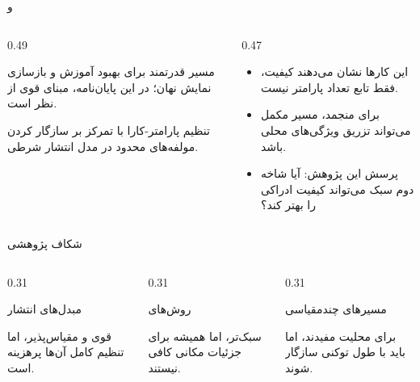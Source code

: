 \documentclass[aspectratio=169, 10pt]{beamer}
\newcommand{\duo}{\lr{DuoDiT}}
\newcommand{\dit}{\lr{DiT}}
\newcommand{\fid}{\lr{FID}}
\newcommand{\compactitems}{\setlength{\itemsep}{0.35em}}
\newcommand{\duoTag}[2]{%
    \begingroup
    {\color{#1}\bfseries\scriptsize #2}%
    \endgroup
}
\newenvironment{duobox}[1]{%
    \begin{block}{#1}\setlength{\parskip}{0.2em}\small
}{%
    \end{block}
}
\begin{document}
\begin{frame}{ و }
    \begin{columns}[onlytextwidth]
        \begin{column}{0.49\textwidth}
            \begin{duobox}{}
                مسیر قدرتمند برای بهبود آموزش و بازسازی نمایش نهان؛ در این پایان‌نامه، مبنای قوی از نظر \fid{} است.
            \end{duobox}
            \begin{duobox}{}
                تنظیم پارامتر-کارا با تمرکز بر سازگار کردن مولفه‌های محدود در مدل انتشار شرطی.
            \end{duobox}
        \end{column}
        \begin{column}{0.47\textwidth}
            \begin{itemize}
                \compactitems
                \item این کارها نشان می‌دهند کیفیت، فقط تابع تعداد پارامتر نیست.
                \item برای \dit{} منجمد، مسیر مکمل می‌تواند تزریق ویژگی‌های محلی باشد.
                \item پرسش این پژوهش: آیا شاخه دوم سبک می‌تواند کیفیت ادراکی را بهتر کند؟
            \end{itemize}
        \end{column}
    \end{columns}
\end{frame}

\begin{frame}{شکاف پژوهشی}
    \begin{columns}[onlytextwidth]
        \begin{column}{0.31\textwidth}
            \begin{duobox}{مبدل‌های انتشار}
                قوی و مقیاس‌پذیر، اما تنظیم کامل آن‌ها پرهزینه است.
            \end{duobox}
        \end{column}
        \begin{column}{0.31\textwidth}
            \begin{duobox}{روش‌های }
                سبک‌تر، اما همیشه برای جزئیات مکانی کافی نیستند.
            \end{duobox}
        \end{column}
        \begin{column}{0.31\textwidth}
            \begin{duobox}{مسیرهای چندمقیاسی}
                برای محلیت مفیدند، اما باید با طول توکنی \dit{} سازگار شوند.
            \end{duobox}
        \end{column}
    \end{columns}
\end{frame}
\end{document}
